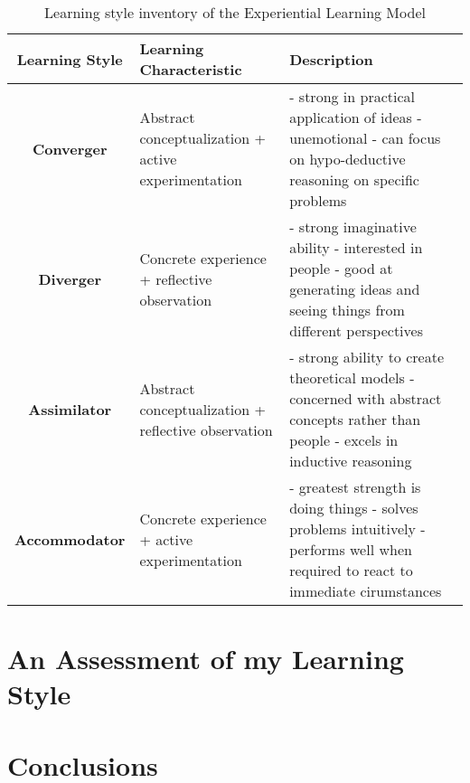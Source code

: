 \documentclass[12pt]{article}
\begin{document}
\begin{singlespacing}
    \begin{table}[H]
        \begin{tabular}{|c|p{5cm}|p{6cm}|}
            \hline
            \textbf{Learning Style} & \textbf{Learning Characteristic} & \textbf{Description} \\ \hline
            \textbf{Converger} & Abstract conceptualization + active experimentation &
            - strong in practical application of ideas \newline
            - unemotional \newline
            - can focus on hypo-deductive reasoning on specific problems \\ \hline
            \textbf{Diverger} & Concrete experience + reflective observation &
            - strong imaginative ability \newline
            - interested in people \newline
            - good at generating ideas and seeing things from different perspectives \\ \hline
            \textbf{Assimilator} & Abstract conceptualization + reflective observation &
            - strong ability to create theoretical models \newline
            - concerned with abstract concepts rather than people \newline
            - excels in inductive reasoning \\ \hline
            \textbf{Accommodator} & Concrete experience + active experimentation &
            - greatest strength is doing things \newline
            - solves problems intuitively \newline
            - performs well when required to react to immediate cirumstances \\ \hline
        \end{tabular}
        \caption{Learning style inventory of the Experiential Learning Model}
    \end{table}
\end{singlespacing}

\section{An Assessment of my Learning Style}

\section{Conclusions} %
\end{document}
